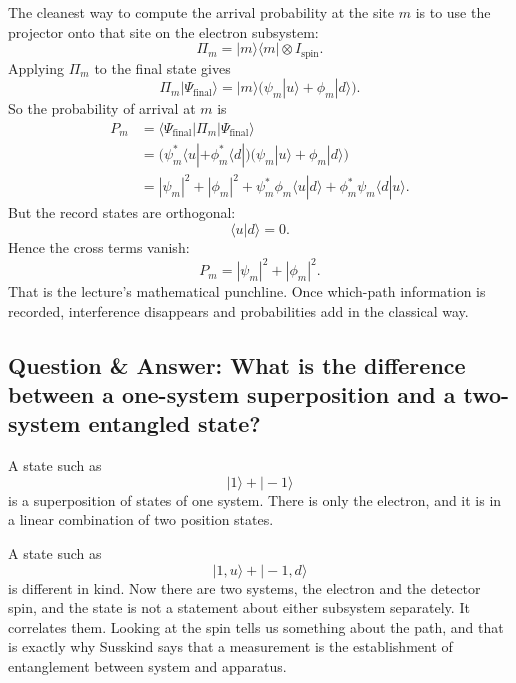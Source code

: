 The cleanest way to compute the arrival probability at the site \(m\) is to use the projector onto that site on the electron subsystem:
\begin{equation}
\Pi_m = |m\rangle\langle m|\otimes I_{\mathrm{spin}}.
\end{equation}
Applying \(\Pi_m\) to the final state gives
\begin{equation}
\Pi_m |\Psi_{\mathrm{final}}\rangle
= |m\rangle\bigl(\psi_m|u\rangle+\phi_m|d\rangle\bigr).
\end{equation}
So the probability of arrival at \(m\) is
\begin{align}
P_m
  &= \langle \Psi_{\mathrm{final}}|\Pi_m|\Psi_{\mathrm{final}}\rangle \\
  &= \bigl(\psi_m^*\langle u|+\phi_m^*\langle d|\bigr)
     \bigl(\psi_m|u\rangle+\phi_m|d\rangle\bigr) \\
  &= |\psi_m|^2 + |\phi_m|^2
     + \psi_m^*\phi_m\langle u|d\rangle
     + \phi_m^*\psi_m\langle d|u\rangle.
\end{align}
But the record states are orthogonal:
\begin{equation}
\langle u|d\rangle=0.
\end{equation}
Hence the cross terms vanish:
\begin{equation}
P_m = |\psi_m|^2 + |\phi_m|^2.
\end{equation}
That is the lecture's mathematical punchline. Once which-path information is recorded, interference disappears and probabilities add in the classical way.

\subsection{Question \& Answer: What is the difference between a one-system superposition and a two-system entangled state?}

A state such as
\begin{equation}
|1\rangle+|-1\rangle
\end{equation}
is a superposition of states of one system. There is only the electron, and it is in a linear combination of two position states.

A state such as
\begin{equation}
|1,u\rangle+|-1,d\rangle
\end{equation}
is different in kind. Now there are two systems, the electron and the detector spin, and the state is not a statement about either subsystem separately. It correlates them. Looking at the spin tells us something about the path, and that is exactly why Susskind says that a measurement is the establishment of entanglement between system and apparatus.

